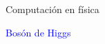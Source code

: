 \documentclass[10pt,xcolor={dvipsnames}]{beamer}
\begin{document}
\begin{frame}{Computación en física}
\begin{center}
\Large{\textcolor{blue}{Bosón de Higgs}} \\
\end{center}
\end{frame}
\end{document}
